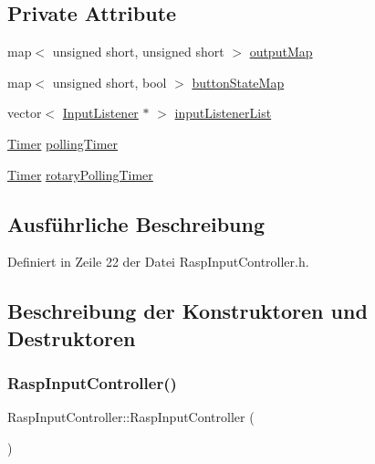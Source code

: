 \subsection*{Private Attribute}
\begin{DoxyCompactItemize}
\item 
map$<$ unsigned short, unsigned short $>$ \hyperlink{class_rasp_input_controller_a7b59eba5cc562eccc91347ddbd777e50}{output\+Map}
\item 
map$<$ unsigned short, bool $>$ \hyperlink{class_rasp_input_controller_ae02dcbb81abe6b6e6e3eaaeef4f3bf4a}{button\+State\+Map}
\item 
vector$<$ \hyperlink{class_input_listener}{Input\+Listener} $\ast$ $>$ \hyperlink{class_rasp_input_controller_a5a5a8d99d69c35e206ddf7467e36cfae}{input\+Listener\+List}
\item 
\hyperlink{class_timer}{Timer} \hyperlink{class_rasp_input_controller_a388779c1ddf9f5910a92cd350cc59e5c}{polling\+Timer}
\item 
\hyperlink{class_timer}{Timer} \hyperlink{class_rasp_input_controller_a55b065ae154806341fd900a8b61110a5}{rotary\+Polling\+Timer}
\end{DoxyCompactItemize}


\subsection{Ausführliche Beschreibung}


Definiert in Zeile 22 der Datei Rasp\+Input\+Controller.\+h.



\subsection{Beschreibung der Konstruktoren und Destruktoren}
\mbox{\label{class_rasp_input_controller_a63a9e2ab7d0eb5aed2da6068454caa65}} 
\subsubsection{\texorpdfstring{Rasp\+Input\+Controller()}{RaspInputController()}}
{\footnotesize\ttfamily Rasp\+Input\+Controller\+::\+Rasp\+Input\+Controller (\begin{DoxyParamCaption}{ }\end{DoxyParamCaption})}




